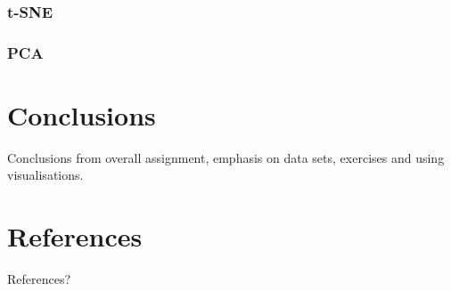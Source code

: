 \documentclass[11pt,a4paper,final]{article}
\begin{document}
\subsubsection{t-SNE}

\subsubsection{PCA}


\section{Conclusions}
Conclusions from overall assignment, emphasis on data sets, exercises and using visualisations.


\section{References}
References?
\end{document}

